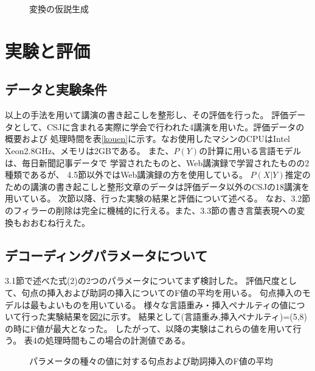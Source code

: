 \begin{figure}[t]
\begin{center}
    \end{center}
    \caption{変換の仮説生成}
    \label{renzoku}
\end{figure}

\section{実験と評価}

\subsection{データと実験条件}

以上の手法を用いて講演の書き起こしを整形し、その評価を行った。
評価データとして、CSJに含まれる実際に学会で行われた4講演を用いた。評価データの概要および
処理時間を表\ref{kouen}に示す。なお使用したマシンのCPUはIntel Xeon2.8GHz、メモリは2GBである。
また、$P(Y)$の計算に用いる言語モデルは、毎日新聞記事データで
学習されたもの\cite{kawahara}と、Web講演録で学習されたもの\cite{katou}の2種類であるが、
4.5節以外ではWeb講演録の方を使用している。
$P(X|Y)$推定のための講演の書き起こしと整形文章のデータは評価データ以外のCSJの18講演を用いている。
次節以降、行った実験の結果と評価について述べる。
なお、3.2節のフィラーの削除は完全に機械的に行える。また、3.3節の書き言葉表現への変換もおおむね行えた。

\subsection{デコーディングパラメータについて}

3.1節で述べた式(2)の2つのパラメータについてまず検討した。
評価尺度として、句点の挿入および助詞の挿入についてのF値の平均を用いる。
句点挿入のモデルは最もよいものを用いている。
様々な言語重み・挿入ペナルティの値について行った実験結果を図\ref{parameter}に示す。
結果として(言語重み,挿入ペナルティ)=(5,8)の時にF値が最大となった。
したがって、以降の実験はこれらの値を用いて行う。 表4の処理時間もこの場合の計測値である。

\begin{figure}[t]
\begin{center}
    \end{center}
    \vspace{-1.0mm}
    \caption{パラメータの種々の値に対する句点および助詞挿入のF値の平均}
    \label{parameter}
\end{figure}

